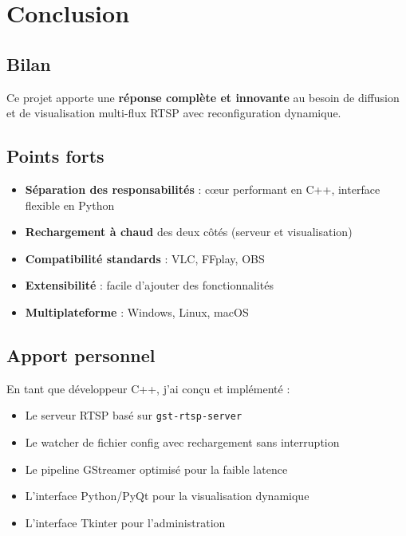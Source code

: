 \documentclass[12pt,a4paper]{report}
\newcommand{\code}[1]{\texttt{#1}}
\newcommand{\important}[1]{\textcolor{primaryBlue}{\textbf{#1}}}
\newcommand{\success}[1]{\textcolor{accentGreen}{\textbf{#1}}}
\newenvironment{infobox}[1]{%
    \begin{tcolorbox}[colback=lightGray!20, colframe=primaryBlue, title=#1, sharp corners]
}{%
    \end{tcolorbox}
}
\begin{document}
\chapter{Conclusion}

\section{Bilan}

Ce projet apporte une \important{réponse complète et innovante} au besoin de diffusion et de visualisation multi-flux RTSP avec reconfiguration dynamique.

\section{Points forts}

\begin{itemize}
    \item \success{Séparation des responsabilités} : cœur performant en C++, interface flexible en Python
    \item \success{Rechargement à chaud} des deux côtés (serveur et visualisation)
    \item \success{Compatibilité standards} : VLC, FFplay, OBS
    \item \success{Extensibilité} : facile d'ajouter des fonctionnalités
    \item \success{Multiplateforme} : Windows, Linux, macOS
\end{itemize}

\section{Apport personnel}

\begin{infobox}{Ayoub Smayen – Développeur C++}
En tant que développeur C++, j'ai conçu et implémenté :
\begin{itemize}
    \item Le serveur RTSP basé sur \code{gst-rtsp-server}
    \item Le watcher de fichier config avec rechargement sans interruption
    \item Le pipeline GStreamer optimisé pour la faible latence
    \item L'interface Python/PyQt pour la visualisation dynamique
    \item L'interface Tkinter pour l'administration
\end{itemize}
\end{infobox}
\end{document}
